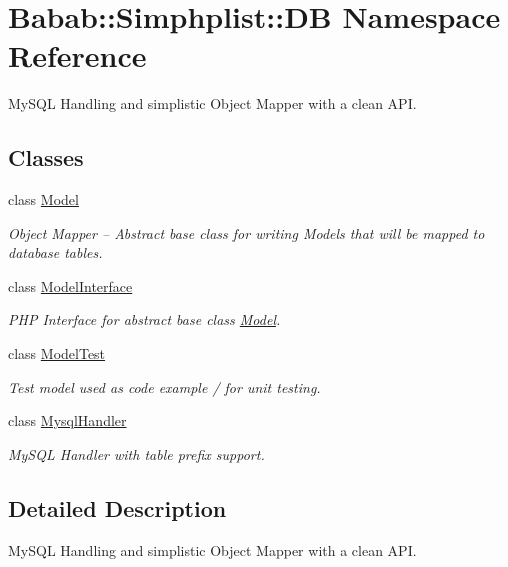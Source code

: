 \hypertarget{namespaceBabab_1_1Simphplist_1_1DB}{\section{Babab\+:\+:Simphplist\+:\+:D\+B Namespace Reference}
\label{namespaceBabab_1_1Simphplist_1_1DB}
}


My\+S\+Q\+L Handling and simplistic Object Mapper with a clean A\+P\+I.  


\subsection*{Classes}
\begin{DoxyCompactItemize}
\item 
class \hyperlink{classBabab_1_1Simphplist_1_1DB_1_1Model}{Model}
\begin{DoxyCompactList}\small\item\em Object Mapper -- Abstract base class for writing Models that will be mapped to database tables. \end{DoxyCompactList}\item 
class \hyperlink{interfaceBabab_1_1Simphplist_1_1DB_1_1ModelInterface}{Model\+Interface}
\begin{DoxyCompactList}\small\item\em P\+H\+P Interface for abstract base class \hyperlink{classBabab_1_1Simphplist_1_1DB_1_1Model}{Model}. \end{DoxyCompactList}\item 
class \hyperlink{classBabab_1_1Simphplist_1_1DB_1_1ModelTest}{Model\+Test}
\begin{DoxyCompactList}\small\item\em Test model used as code example / for unit testing. \end{DoxyCompactList}\item 
class \hyperlink{classBabab_1_1Simphplist_1_1DB_1_1MysqlHandler}{Mysql\+Handler}
\begin{DoxyCompactList}\small\item\em My\+S\+Q\+L Handler with table prefix support. \end{DoxyCompactList}\end{DoxyCompactItemize}


\subsection{Detailed Description}
My\+S\+Q\+L Handling and simplistic Object Mapper with a clean A\+P\+I. 